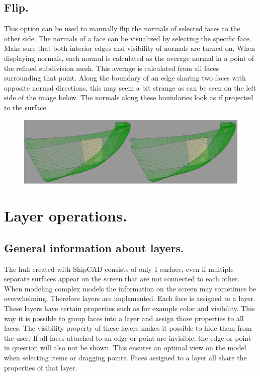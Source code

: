 \documentclass[12pt]{article}
\begin{document}
\subsection{Flip.} \label{flip}
This option can be used to manually flip the normals of selected faces
to the other side. The normals of a face can be visualized by
selecting the specific face. Make sure that both interior edges and
visibility of normals are turned on. When displaying normals, each
normal is calculated as the average normal in a point of the refined
subdivision mesh. This average is calculated from all faces
surrounding that point. Along the boundary of an edge sharing two
faces with opposite normal directions, this may seem a bit strange as
can be seen on the left side of the image below. The normals along
these boundaries look as if projected to the surface.

\begin{figure}[h]
        \centering
        \includegraphics[width=15cm,natwidth=1132,natheight=342]{flipnormal.png}
        \caption{}
        \label{fig:flipnormal}
\end{figure}

\pagebreak

\section{Layer operations.}

\subsection{General information about layers.} \label{general-info-layer}
The hull created with ShipCAD consists of only 1 surface, even if
multiple separate surfaces appear on the screen that are not connected
to each other. When modeling complex models the information on the
screen may sometimes be overwhelming. Therefore layers are
implemented.  Each face is assigned to a layer. These layers have
certain properties such as for example color and visibility. This way
it is possible to group faces into a layer and assign those properties
to all faces. The visibility property of these layers makes it
possible to hide them from the user. If all faces attached to an edge
or point are invisible, the edge or point in question will also not be
shown. This ensures an optimal view on the model when selecting items
or dragging points. Faces assigned to a layer all share the properties
of that layer.
\end{document}
